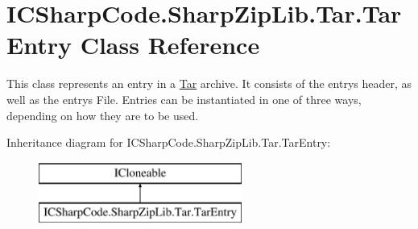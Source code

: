 \hypertarget{class_i_c_sharp_code_1_1_sharp_zip_lib_1_1_tar_1_1_tar_entry}{}\section{I\+C\+Sharp\+Code.\+Sharp\+Zip\+Lib.\+Tar.\+Tar\+Entry Class Reference}
\label{class_i_c_sharp_code_1_1_sharp_zip_lib_1_1_tar_1_1_tar_entry}


This class represents an entry in a \hyperlink{namespace_i_c_sharp_code_1_1_sharp_zip_lib_1_1_tar}{Tar} archive. It consists of the entry\textquotesingle{}s header, as well as the entry\textquotesingle{}s File. Entries can be instantiated in one of three ways, depending on how they are to be used.  


Inheritance diagram for I\+C\+Sharp\+Code.\+Sharp\+Zip\+Lib.\+Tar.\+Tar\+Entry\+:\begin{figure}[H]
\begin{center}
\leavevmode
\includegraphics[height=2.000000cm]{class_i_c_sharp_code_1_1_sharp_zip_lib_1_1_tar_1_1_tar_entry}
\end{center}
\end{figure}
